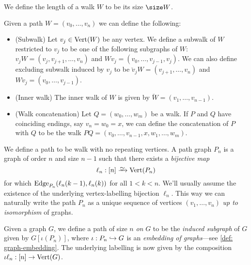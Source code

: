 \begin{definition}[Length]\label{def: walk-length}
    We define the length of a walk \(W\) to be its size \(\size W\).
\end{definition}

\begin{definition}\label{def: walk-operations}
    Given a path \(W = (v_0, \dots, v_n)\) we can define the following:
    \begin{itemize}
        \setlength\itemsep{0.0em}
        \item (Subwalk) Let \(v_j \in \operatorname{Vert}(W)\) be any vertex. We define a subwalk of
              \(W\) restricted to \(v_j\) to be one of the following subgraphs of \(W\):
              \(v_jW = (v_j, v_{j+1}, \dots, v_n)\) and \(Wv_j = (v_0, \dots, v_{j-1},
              v_j)\). We can also define excluding subwalk induced by \(v_j\) to be
              \(\breve v_j W = (v_{j+1}, \dots, v_n)\) and \(W \breve v_j = (v_0, \dots,
              v_{j-1})\).
        \item (Inner walk) The inner walk of \(W\) is given by \(\breve W = (v_1,
              \dots, v_{n-1})\).
        \item (Walk concatenation) Let \(Q = (w_0, \dots, w_m)\) be a walk.
              If \(P\) and \(Q\) have coinciding endings, say \(v_n = w_0 = x\), we can
              define the concatenation of \(P\) with \(Q\) to be the walk \(PQ = (v_0,
              \dots, v_{n-1}, x, w_1, \dots, w_m)\).
    \end{itemize}
\end{definition}

\begin{definition}[Path]\label{def: path}
    We define a path to be walk with no repeating vertices. A path graph \(P_n\)
    is a graph of order \(n\) and size \(n-1\) such that there exists a
    \emph{bijective map}
    \[
        \ell_n: [n] \isoto \Vertex(P_n)
    \]
    for which \(\operatorname{Edge}_{P_n}(\ell_n(k-1), \ell_n(k))\) for all \(1 < k < n\).
    We'll usually assume the existence of the underlying vertex-labelling bijection
    \(\ell_n\). This way we can naturally write the path \(P_n\) as a unique
    sequence of vertices \((v_1, \dots, v_n)\) \emph{up to isomorphism} of
    graphs.

    Given a graph \(G\), we define a path of size \(n\) \emph{on} \(G\) to be
    the \emph{induced subgraph} of \(G\) given by \(G[\iota(P_n)]\), where
    \(\iota: P_n \hookrightarrow G\) is an \emph{embedding of graphs}---see \cref{def:
        graph-embedding}. The underlying labelling is now given by the composition
    \(\iota \ell_n: [n] \to \operatorname{Vert}(G)\).
\end{definition}

